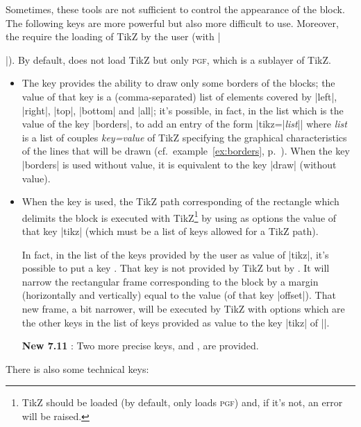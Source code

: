 \documentclass[dvipsnames]{article}
\begin{document}
\medskip
Sometimes, these tools are not sufficient to control the appearance of the
block. The following keys are more powerful but also more difficult to use.
Moreover, the require the loading of TikZ by the user (with
|\usepackage{tikz}|). By default,  does not load TikZ but only
\textsc{pgf}, which is a sublayer of TikZ.

\begin{itemize}
\item {}
The key  provides the ability to draw only some
borders of the blocks; the value of that key is a (comma-separated) list of
elements covered by |left|, |right|, |top|, |bottom| and |all|; it's possible, in
fact, in the list which is the value of the key |borders|, to add an entry of
the form |tikz={|\textsl{list}|}| where \textsl{list} is a list of couples
\textsl{key=value} of TikZ specifying the graphical characteristics of the
lines that will be drawn (cf.~example~\ref{ex:borders}, p.~\pageref{ex:borders}). When the key
|borders| is used without value, it is equivalent to the key |draw| (without value).

\item {}
When the key  is used, the TikZ path corresponding of
the rectangle which delimits the block is executed with TikZ\footnote{TikZ
should be loaded (by default,  only loads \textsc{pgf}) and,
if it's not, an error will be raised.} by using as options the value of that
key |tikz| (which must be a list of keys allowed for a TikZ path). 

In fact, in the list of the keys provided by the user as value of |tikz|, it's
possible to put a key . That key is not provided by TikZ but
by . It will narrow the rectangular frame corresponding to the
block by a margin (horizontally and vertically) equal to the value (of that key
|offset|). That new frame, a bit narrower, will be executed by TikZ with options
which are the other keys in the list of keys provided as value to the key |tikz|
of |\Block|.

\smallskip
\colorbox{yellow!50}{\textbf{New 7.11}} : Two more precise keys, 
and , are provided.
\end{itemize}


\medskip
There is also some technical keys:
\end{document}
